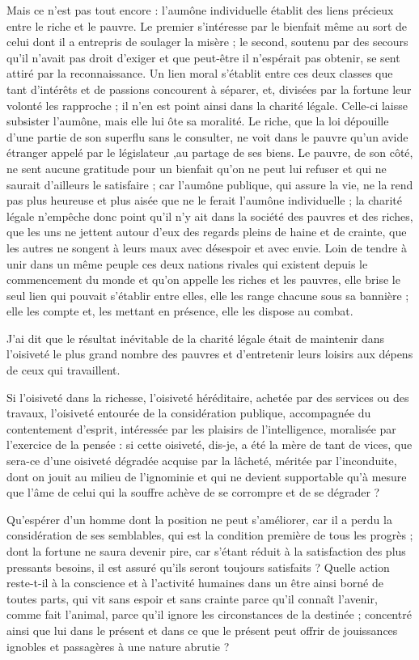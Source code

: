 \documentclass[french,twoside]{book} %
\begin{document}
Mais ce n’est pas tout encore : l’aumône individuelle établit des liens précieux entre le riche et le pauvre. Le premier s’intéresse par le bienfait même au sort de celui dont il a entrepris de soulager la misère ; le second, soutenu par des secours qu’il n’avait pas droit d’exiger et que peut-être il n’espérait pas obtenir, se sent attiré par la reconnaissance. Un lien moral s’établit entre ces deux classes que tant d’intérêts et de passions concourent à séparer, et, divisées par la fortune leur volonté les rapproche ; il n’en est point ainsi dans la charité légale. Celle-ci laisse subsister l’aumône, mais elle lui ôte sa moralité. Le riche, que la loi dépouille d’une partie de son superflu sans le consulter, ne voit dans le pauvre qu’un avide étranger appelé par le législateur ,au partage de ses biens. Le pauvre, de son côté, ne sent aucune gratitude pour un bienfait qu’on ne peut lui refuser et qui ne saurait d’ailleurs le satisfaire ; car l’aumône publique, qui assure la vie, ne la rend pas plus heureuse et plus aisée que ne le ferait l’aumône individuelle ; la charité légale n’empêche donc point qu’il n’y ait dans la société des pauvres et des riches, que les uns ne jettent autour d’eux des regards pleins de haine et de crainte, que les autres ne songent à leurs maux avec désespoir et avec envie. Loin de tendre à unir dans un même peuple ces deux nations rivales qui existent depuis le commencement du monde et qu’on appelle les riches et les pauvres, elle brise le seul lien qui pouvait s’établir entre elles, elle les range chacune sous sa bannière ; elle les compte et, les mettant en présence, elle les dispose au combat.\par
J'ai dit que le résultat inévitable de la charité légale était de maintenir dans l’oisiveté le plus grand nombre des pauvres et d’entretenir leurs loisirs aux dépens de ceux qui travaillent.\par
Si l’oisiveté dans la richesse, l’oisiveté héréditaire, achetée par des services ou des travaux, l’oisiveté entourée de la considération publique, accompagnée du contentement d’esprit, intéressée par les plaisirs de l’intelligence, moralisée par l’exercice de la pensée : si cette oisiveté, dis-je, a été la mère de tant de vices, que sera-ce d’une oisiveté dégradée acquise par la lâcheté, méritée par l’inconduite, dont on jouit au milieu de l’ignominie et qui ne devient supportable qu’à mesure que l’âme de celui qui la souffre achève de se corrompre et de se dégrader ?\par
Qu'espérer d’un homme dont la position ne peut s’améliorer, car il a perdu la considération de ses semblables, qui est la condition première de tous les progrès ; dont la fortune ne saura devenir pire, car s’étant réduit à la satisfaction des plus pressants besoins, il est assuré qu’ils seront toujours satisfaits ? Quelle action reste-t-il à la conscience et à l’activité humaines dans un être ainsi borné de toutes parts, qui vit sans espoir et sans crainte parce qu’il connaît l’avenir, comme fait l’animal, parce qu’il ignore les circonstances de la destinée ; concentré ainsi que lui dans le présent et dans ce que le présent peut offrir de jouissances ignobles et passagères à une nature abrutie ?\par
\end{document}
